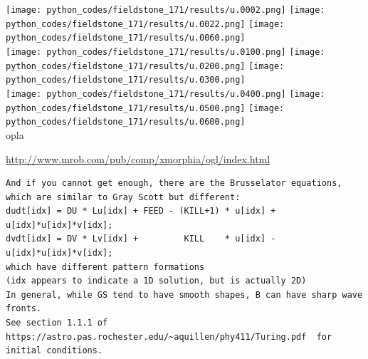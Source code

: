 \begin{center}
\texttt{[image: python\_codes/fieldstone\_171/results/u.0002.png]}
\texttt{[image: python\_codes/fieldstone\_171/results/u.0022.png]}
\texttt{[image: python\_codes/fieldstone\_171/results/u.0060.png]}\\
\texttt{[image: python\_codes/fieldstone\_171/results/u.0100.png]}
\texttt{[image: python\_codes/fieldstone\_171/results/u.0200.png]}
\texttt{[image: python\_codes/fieldstone\_171/results/u.0300.png]}\\
\texttt{[image: python\_codes/fieldstone\_171/results/u.0400.png]}
\texttt{[image: python\_codes/fieldstone\_171/results/u.0500.png]}
\texttt{[image: python\_codes/fieldstone\_171/results/u.0600.png]}\\
{\captionfont opla}
\end{center}










\url{
http://www.mrob.com/pub/comp/xmorphia/ogl/index.html
}


\begin{verbatim}
And if you cannot get enough, there are the Brusselator equations, which are similar to Gray Scott but different:
dudt[idx] = DU * Lu[idx] + FEED - (KILL+1) * u[idx] + u[idx]*u[idx]*v[idx];
dvdt[idx] = DV * Lv[idx] +         KILL    * u[idx] - u[idx]*u[idx]*v[idx];
which have different pattern formations
(idx appears to indicate a 1D solution, but is actually 2D)
In general, while GS tend to have smooth shapes, B can have sharp wave fronts.
See section 1.1.1 of https://astro.pas.rochester.edu/~aquillen/phy411/Turing.pdf  for initial conditions.
\end{verbatim}




